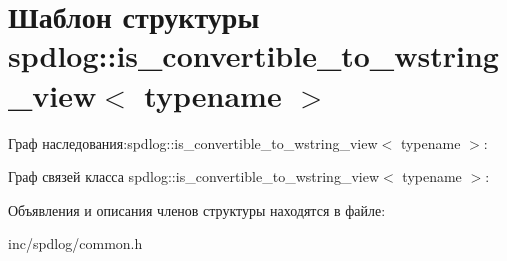\hypertarget{structspdlog_1_1is__convertible__to__wstring__view}{}\section{Шаблон структуры spdlog\+:\+:is\+\_\+convertible\+\_\+to\+\_\+wstring\+\_\+view$<$ typename $>$}
\label{structspdlog_1_1is__convertible__to__wstring__view}


Граф наследования\+:spdlog\+:\+:is\+\_\+convertible\+\_\+to\+\_\+wstring\+\_\+view$<$ typename $>$\+:


Граф связей класса spdlog\+:\+:is\+\_\+convertible\+\_\+to\+\_\+wstring\+\_\+view$<$ typename $>$\+:


Объявления и описания членов структуры находятся в файле\+:\begin{DoxyCompactItemize}
\item 
inc/spdlog/common.\+h\end{DoxyCompactItemize}
